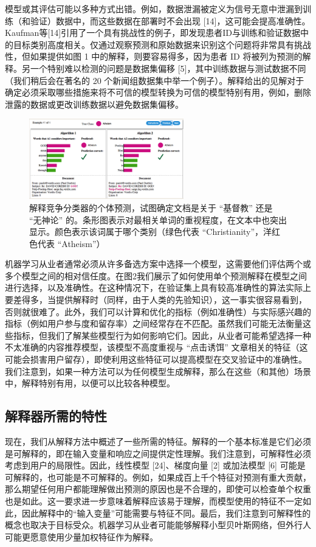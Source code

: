 \documentclass[12pt, a4paper]{ctexart} %
\begin{document}
模型或其评估可能以多种方式出错。例如，数据泄漏被定义为信号无意中泄漏到训练（和验证）数据中，而这些数据在部署时不会出现 [14]，这可能会提高准确性。Kaufman等[14]引用了一个具有挑战性的例子，即发现患者ID与训练和验证数据中的目标类别高度相关。仅通过观察预测和原始数据来识别这个问题将非常具有挑战性，但如果提供如图 1 中的解释，则要容易得多，因为患者 ID 将被列为预测的解释。另一个特别难以检测的问题是数据集偏移 [5]，其中训练数据与测试数据不同（我们稍后会在著名的 20 个新闻组数据集中举一个例子）。解释给出的见解对于确定必须采取哪些措施来将不可信的模型转换为可信的模型特别有用，例如，删除泄露的数据或更改训练数据以避免数据集偏移。

\begin{figure}[h]
    \centering
    \includegraphics[width=0.6\textwidth]{img/img_2.png}
    \caption{解释竞争分类器的个体预测，试图确定文档是关于 “基督教” 还是 “无神论” 的。条形图表示对最相关单词的重视程度，在文本中也突出显示。颜色表示该词属于哪个类别（绿色代表 “Christianity”，洋红色代表 “Atheism”）}
    \label{fig:img_2}
\end{figure}
机器学习从业者通常必须从许多备选方案中选择一个模型，这需要他们评估两个或多个模型之间的相对信任度。在图2我们展示了如何使用单个预测解释在模型之间进行选择，以及准确性。在这种情况下，在验证集上具有较高准确性的算法实际上要差得多，当提供解释时（同样，由于人类的先验知识），这一事实很容易看到，否则就很难了。此外，我们可以计算和优化的指标（例如准确性）与实际感兴趣的指标（例如用户参与度和留存率）之间经常存在不匹配。虽然我们可能无法衡量这些指标，但我们了解某些模型行为如何影响它们。因此，从业者可能希望选择一种不太准确的内容推荐模型，该模型不高度重视与 “点击诱饵” 文章相关的特征（这可能会损害用户留存），即使利用这些特征可以提高模型在交叉验证中的准确性。我们注意到，如果一种方法可以为任何模型生成解释，那么在这些（和其他）场景中，解释特别有用，以便可以比较各种模型。

\subsection{解释器所需的特性}
现在，我们从解释方法中概述了一些所需的特征。解释的一个基本标准是它们必须是可解释的，即在输入变量和响应之间提供定性理解。我们注意到，可解释性必须考虑到用户的局限性。因此，线性模型 [24]、梯度向量 [2] 或加法模型 [6] 可能是可解释的，也可能是不可解释的。例如，如果成百上千个特征对预测有重大贡献，那么期望任何用户都能理解做出预测的原因也是不合理的，即使可以检查单个权重也是如此。这一要求进一步意味着解释应该易于理解，而模型使用的特征不一定如此，因此解释中的“输入变量”可能需要与特征不同。最后，我们注意到可解释性的概念也取决于目标受众。机器学习从业者可能能够解释小型贝叶斯网络，但外行人可能更愿意使用少量加权特征作为解释。
\end{document}
